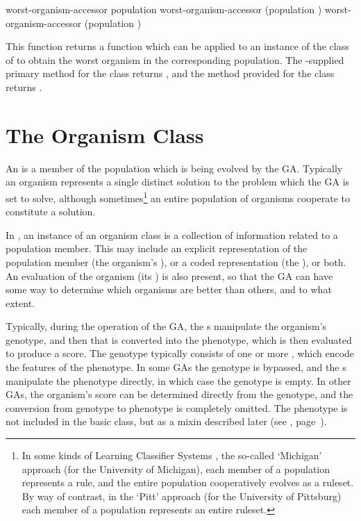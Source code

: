 {\filbreak

{\samepage
\Defgeneric worst-organism-accessor {population}
 worst-organism-accessor {(population )}
 worst-organism-accessor {(population )}

This function returns a function which can be applied to an instance of the
 class of  to obtain the worst organism in
the corresponding population. The \geco-supplied primary method for the
 class returns , and the
method provided for the  class returns
. \par}%


\section{The Organism Class}

An  is a member of the population which is being evolved by the GA. Typically
an organism represents a single distinct solution to the problem which the GA is set to
solve, although sometimes\footnote{%
%
In some kinds of Learning Classifier Systems \cite{gbml:holland-reitman,gbml:holland-induction},
the so-called `Michigan' approach (for the University of Michigan), each member of a
population represents a rule, and the entire population cooperatively evolves as a ruleset.
By way of contrast, in the `Pitt' approach (for the University of Pittsburg) each member of a
population represents an entire ruleset.
%
} an entire population of organisms cooperate to constitute a solution.
\filbreak

In \geco, an instance of an organism class is a collection of information related to
a population member. This may include an explicit representation of the population
member (the organism's ), or a coded representation (the
), or both. An evaluation of the organism (its ) is also
present, so that the GA can have some way to determine which organisms are better
than others, and to what extent.
\filbreak

Typically, during the operation of the GA, the s
manipulate the organism's genotype, and then that is converted into the
phenotype, which is then evaluated to produce a score. The genotype typically
consists of one or more , which encode the features of the
phenotype. In some GAs the genotype is bypassed, and the s
manipulate the phenotype directly, in which case the genotype is empty. In other
GAs, the organism's score can be determined directly from the genotype, and the
conversion from genotype to phenotype is completely omitted. The phenotype is not
included in the basic  class, but as a mixin described later (see
, page~\pageref{class:organism-phenotype-mixin}).

}
